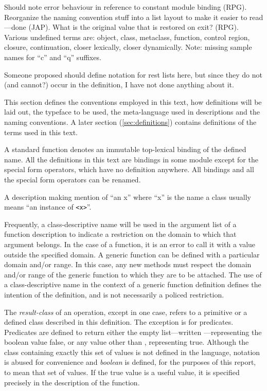 %
\label{conventions}
\begin{optPrivate}
    Should note error behaviour in reference to constant module binding (RPG).
    Reorganize the naming convention stuff into a list layout to make it easier
    to read---done (JAP).  What is the original value that is restored on exit?
    (RPG).  Various undefined terms are: object, class, metaclass, function,
    control region, closure, continuation, closer lexically, closer dynamically.
    Note: missing sample names for ``c'' and ``q'' suffixes.

    Someone proposed should define notation for rest lists here, but since they
    do not (and cannot?) occur in the definition, I have not done anything about
    it.
\end{optPrivate}
%
\begin{optDefinition}
This section defines the conventions employed in this text, how
definitions will be laid out, the typeface to be used, the
meta-language used in descriptions and the naming conventions.  A
later section (\ref{sec:definitions}) contains definitions of the
terms used in this text.

A standard function denotes an
immutable top-lexical binding of the defined name.  All the definitions in this
text are bindings in some module except for the special form operators, which
have no definition anywhere.  All bindings and all the special form operators
can be renamed.
%
\begin{note}
    A description making mention of ``an x'' where ``x'' is the name a
    class usually means ``an instance of {\tt <x>}''.
\end{note}
%
Frequently, a class-descriptive name will be used in the argument list of a
function description to indicate a restriction on the domain to which that
argument belongs.  In the case of a function, it is an error to call it with a
value outside the specified domain.  A generic function can be defined with a
particular domain and/or range.  In this case, any new methods must respect the
domain and/or range of the generic function to which they are to be attached.
The use of a class-descriptive name in the context of a generic function
definition defines the intention of the definition, and is not necessarily a
policed restriction.

The {\em result-class} of an operation, except in one case, refers to a
primitive or a defined class described in this definition.  The exception is for
predicates.  Predicates are defined to return either the empty list---written
\nil---representing the boolean value false, or any
value other than \nil, representing true.  Although the
class containing exactly this set of values is not defined in the language,
notation is abused for convenience and {\em boolean} is
defined, for the purposes of this report, to mean that set of values.  If the
true value is a useful value, it is specified precisely in the description of
the function.
\end{optDefinition}
